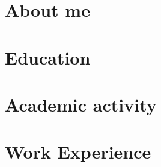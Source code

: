 \documentclass[]{paper}
\begin{document}


\section{About me}


\section{Education}


\section{Academic activity}


\section{Work Experience}

\end{document}
